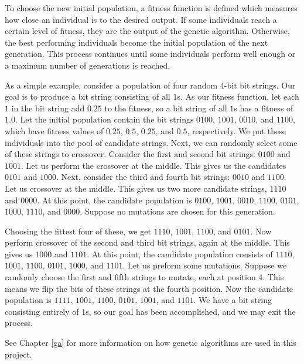 To choose the new initial population, a fitness function is defined which measures how close an individual is to the desired output.
If some individuals reach a certain level of fitness, they are the output of the genetic algorithm.
Otherwise, the best performing individuals become the initial population of the next generation.
This process continues until some individuals perform well enough or a maximum number of generations is reached.

As a simple example, consider a population of four random 4-bit bit strings.
Our goal is to produce a bit string consisting of all $1$s.
As our fitness function, let each $1$ in the bit string add $0.25$ to the fitness, so a bit string of all $1$s has a fitness of $1.0$.
Let the initial population contain the bit strings $0100$, $1001$, $0010$, and $1100$, which have fitness values of $0.25$, $0.5$, $0.25$, and $0.5$, respectively.
We put these individuals into the pool of candidate strings.
Next, we can randomly select some of these strings to crossover.
Consider the first and second bit strings: $0100$ and $1001$.
Let us perform the crossover at the middle.
This gives us the candidates $0101$ and $1000$.
Next, consider the third and fourth bit strings: $0010$ and $1100$. Let us crossover at the middle.
This gives us two more candidate strings, $1110$ and $0000$.
At this point, the candidate population is $0100$, $1001$, $0010$, $1100$, $0101$, $1000$, $1110$, and $0000$.
Suppose no mutations are chosen for this generation.

Choosing the fittest four of these, we get $1110$, $1001$, $1100$, and $0101$.
Now perform crossover of the second and third bit strings, again at the middle.
This gives us $1000$ and $1101$.
At this point, the candidate population consists of $1110$, $1001$, $1100$, $0101$, $1000$, and $1101$.
Let us preform some mutations.
Suppose we randomly choose the first and fifth strings to mutate, each at position $4$.
This means we flip the bits of these strings at the fourth position.
Now the candidate population is $1111$, $1001$, $1100$, $0101$, $1001$, and $1101$.
We have a bit string consisting entirely of $1$s, so our goal has been accomplished, and we may exit the process.

See Chapter \ref{ga} for more information on how genetic algorithms are used in this project.
